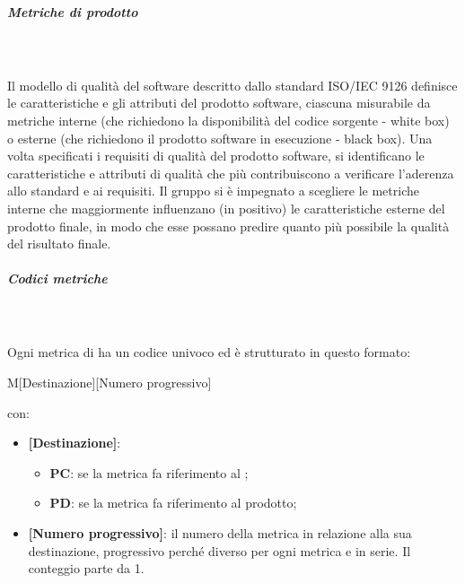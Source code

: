 \subparagraph{Metriche di prodotto}\mbox{}\\ \\
Il modello di qualità del software descritto dallo standard ISO/IEC 9126 definisce le caratteristiche e gli attributi del prodotto software, ciascuna misurabile da metriche interne (che richiedono la disponibilità del codice sorgente - white box) o esterne (che richiedono il prodotto software in esecuzione - black box).
Una volta specificati i requisiti di qualità del prodotto software, si identificano le caratteristiche e attributi di qualità che più contribuiscono a verificare l'aderenza allo standard e ai requisiti.
Il gruppo \Gruppo{} si è impegnato a scegliere le metriche interne che maggiormente influenzano (in positivo) le caratteristiche esterne del prodotto finale, in modo che esse possano predire quanto più possibile la qualità del risultato finale.

\subparagraph{Codici metriche}\mbox{}\\ \\
Ogni metrica di  ha un codice univoco ed è strutturato in questo formato:
\begin{center}
    M[Destinazione][Numero progressivo]
\end{center}
con:
\begin{itemize}  
    \item \textbf{[Destinazione]}:
    \begin{itemize}
        \item \textbf{PC}: se la metrica fa riferimento al ;
        \item \textbf{PD}: se la metrica fa riferimento al prodotto;
    \end{itemize}
    \item \textbf{[Numero progressivo]}: il numero della metrica in relazione alla sua destinazione, progressivo perché diverso per ogni metrica e in serie. Il conteggio parte da 1.
\end{itemize}

